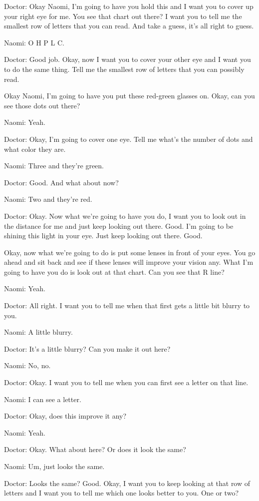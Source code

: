 Doctor: Okay Naomi, I'm going to have you hold this and I want you to cover up your right eye for me. You see that chart out there? I want you to tell me the smallest row of letters that you can read. And take a guess, it's all right to guess.

Naomi: O H P L C.

Doctor: Good job. Okay, now I want you to cover your other eye and I want you to do the same thing. Tell me the smallest row of letters that you can possibly read.

Okay Naomi, I'm going to have you put these red-green glasses on. Okay, can you see those dots out there?

Naomi: Yeah.

Doctor: Okay, I'm going to cover one eye. Tell me what's the number of dots and what color they are.

Naomi: Three and they're green.

Doctor: Good. And what about now?

Naomi: Two and they're red.

Doctor: Okay. Now what we're going to have you do, I want you to look out in the distance for me and just keep looking out there. Good. I'm going to be shining this light in your eye. Just keep looking out there. Good.

Okay, now what we're going to do is put some lenses in front of your eyes. You go ahead and sit back and see if these lenses will improve your vision any. What I'm going to have you do is look out at that chart. Can you see that R line?

Naomi: Yeah.

Doctor: All right. I want you to tell me when that first gets a little bit blurry to you.

Naomi: A little blurry.

Doctor: It's a little blurry? Can you make it out here?

Naomi: No, no.

Doctor: Okay. I want you to tell me when you can first see a letter on that line.

Naomi: I can see a letter.

Doctor: Okay, does this improve it any?

Naomi: Yeah.

Doctor: Okay. What about here? Or does it look the same?

Naomi: Um, just looks the same.

Doctor: Looks the same? Good. Okay, I want you to keep looking at that row of letters and I want you to tell me which one looks better to you. One or two?

